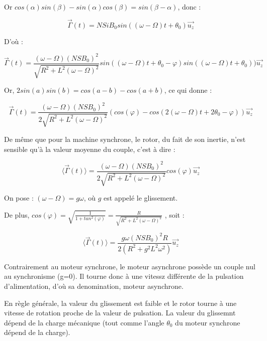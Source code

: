 \documentclass[12pt,prb,aps,epsf]{article}
\begin{document}
Or $cos(\alpha)sin(\beta) - sin(\alpha)cos(\beta) = sin(\beta - \alpha)$, donc :

\begin{equation}
    \vec{\Gamma}(t) = NSiB_0 sin ((\omega - \Omega) t + \theta_0) \vec{u_z}
\end{equation}

D'où :

\begin{equation}
     \vec{\Gamma}(t) = \frac{(\omega - \Omega)(NSB_0)^2}{\sqrt{R^2+L^2(\omega - \Omega)^2}} sin((\omega - \Omega) t + \theta_0 - \varphi)sin((\omega - \Omega) t + \theta_0))\vec{u_z}
\end{equation}

Or, $2sin(a)sin(b) = cos(a - b) - cos(a+b)$, ce qui donne :

\begin{equation}
     \vec{\Gamma}(t) = \frac{(\omega - \Omega)(NSB_0)^2}{2\sqrt{R^2+L^2(\omega - \Omega)^2}} (cos(\varphi) - cos (2(\omega - \Omega) t + 2 \theta_0 - \varphi))\vec{u_z}
\end{equation}

De même que pour la machine synchrone, le rotor, du fait de son inertie, n'est sensible qu'à la valeur moyenne du couple, c'est à dire :

\begin{equation}
    \langle \vec{\Gamma}(t) \rangle = \frac{(\omega - \Omega)(NSB_0)^2}{2\sqrt{R^2+L^2(\omega - \Omega)^2}} cos(\varphi) \vec{u_z}
\end{equation}

On pose : $(\omega - \Omega) = g\omega$, où $g$ est appelé le glissement.\medskip

De plus, $cos(\varphi) = \sqrt{\frac{1}{1 + tan^2 (\varphi)}}= \frac{R}{\sqrt{R^2 + L^2(\omega -\Omega)^2}}$ , soit :

\begin{equation}
     \langle \vec{\Gamma}(t) \rangle = \frac{g\omega (NSB_0)^2R}{2(R^2 + g^2L^2\omega^2)}\vec{u_z}
\end{equation}

Contrairement au moteur synchrone, le moteur asynchrone possède un couple nul au synchronisme (g=0). Il tourne donc à une vitessz différente de la pulsation d'alimentation, d'où sa denomination, moteur asynchrone.\medskip

En règle générale, la valeur du glissement est faible et le rotor tourne à une vitesse de rotation proche de la valeur de pulsation. La valeur du glissemnt dépend de la charge mécanique (tout comme l'angle $\theta_0$ du moteur synchrone dépend de la charge).\medskip
\end{document}
